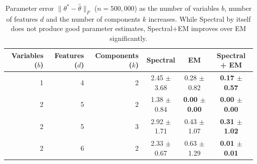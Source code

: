 
\begin{table}[tbhp]
\caption{Parameter error $\|\theta^* - \hat \theta\|_F$ ($n = 500,000$)
as the number of variables $b$, number of features $d$ and the number of components $k$ increases.
While Spectral by itself does not produce good parameter estimates, Spectral+EM improves
over EM significantly.
}
\label{tbl:parameter-recovery}
\vskip 0.15in
\begin{center}
\begin{small}
\begin{sc}

  \begin{tabular}{ r r r c c c }
\hline
\abovespace\belowspace
Variables ($b$) & Features ($d$) & Components ($k$) & Spectral & EM & Spectral + EM \\
\hline
\abovespace
  1 & 4 & 2 & 2.45 $\pm$ 3.68 & 0.28 $\pm$ 0.82 & {\bf 0.17 $\pm$ 0.57} \\
2 & 5 & 2 & 1.38 $\pm$ 0.84 & {\bf 0.00 $\pm$ 0.00} & {\bf 0.00 $\pm$ 0.00} \\
  2 & 5 & 3 & 2.92 $\pm$ 1.71 & 0.43 $\pm$ 1.07 & {\bf 0.31 $\pm$ 1.02} \\
  2 & 6 & 2 & 2.33 $\pm$ 0.67 & 0.63 $\pm$ 1.29 & {\bf 0.01 $\pm$ 0.01} \\



\end{tabular}
\end{sc}
\end{small}
\end{center}
\end{table}
